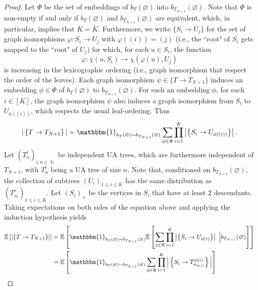 \documentclass[11pt]{article}
\numberwithin{equation}{section}
\DeclareMathOperator{\N}{\mathbb{N}} %
\newcommand{\E}{\mathbb{E}} %
\theoremstyle{definition}
\begin{document}
\begin{proof}
Let $\Phi$ be the set of embeddings of $b_{T}(\varnothing)$ into $b_{T_{N+1}}(\varnothing)$. Note that $\Phi$ is non-empty if and only if $b_{T}(\varnothing)$ and $b_{T_{N+1}}(\varnothing)$ are equivalent, which, in particular, implies that $K=\overline{K}$. Furthermore, we write $\{S_i \to U_j\}$ for the set of graph isomorphisms $\varphi : S_i \to U_j$ with $\varphi((i))=(j)$ (i.e., the ``root" of $S_i$ gets mapped to the ``root" of $U_j$) for which, for each $u \in S_i$, the function
\begin{equation*}
    \varphi : \chi(u,S_i) \to \chi(\varphi(u), U_j)
\end{equation*}
is increasing in the lexicographic ordering (i.e., graph isomorphism that respect the order of the leaves). Each graph isomorphism $\psi \in \{T \to T_{N+1}\}$ induces an embedding $\phi \in \Phi$ of $b_T(\varnothing)$ to $b_{T_{N+1}}(\varnothing)$. For such an embedding $\phi$, for each $i \in [K]$, the graph isomorphism $\psi$ also induces a graph isomorphism from $S_i$ to $U_{\phi((i))}$, which respects the usual leaf-ordering. Thus
    \begin{equation*}
    	|\left\{T \rightarrow T_{N+1} \right\}| = \mathbbm{1}_{b_{T}(\varnothing)\sim b_{T_{N+1}}(\varnothing) } \sum_{\phi \in \Phi}  \prod_{i=1}^{K} \left|\left\{S_i \rightarrow U_{\phi((i))} \right\}\right| .
    \end{equation*}
    Let $\left(T_n^i\right)_{i,n\in \N}$ be independent UA trees, which are furthermore independent of $T_{N+1}$, with $T_n^i$ being a UA tree of size $n$. Note that, conditioned on $b_{T_{N+1}}(\varnothing)$, the collection of subtrees $(U_i)_{1\leq i \leq \overline{K}}$ has the same distribution as $(T_{u_i}^i)_{1\leq i \leq \overline{K}}$.
    Let $(S_i)_+$ be the vertices in $S_i$ that have at least $2$ descendants.
   Taking expectations on both sides of the equation above and applying the induction hypothesis yields
    \begin{align*}
     \E \left[\left|\left\{T \rightarrow T_{N+1} \right\}\right|\right] 
    &= \E \left[ \mathbbm{1}_{b_T(\varnothing)\sim b_{T_{N+1}}(\varnothing)}  \E \left[ \sum_{\phi \in \Phi}  \prod_{i=1}^{K} \left|\left\{S_i \rightarrow U_{\phi(i)} \right\}\right| \ \Big| b_{T_{N+1}}(\varnothing) \right] \right]\\
    & = \E \left[ \mathbbm{1}_{b_T(\varnothing)\sim b_{T_{N+1}}(\varnothing)}  \sum_{\phi \in \Phi}  \prod_{i=1}^{K} \Big| \left\{S_i \rightarrow T_{u_{\phi(i)}}^{\phi(i)} \right\} \Big|  \right] \\

\end{align*}
\end{proof}
\end{document}

